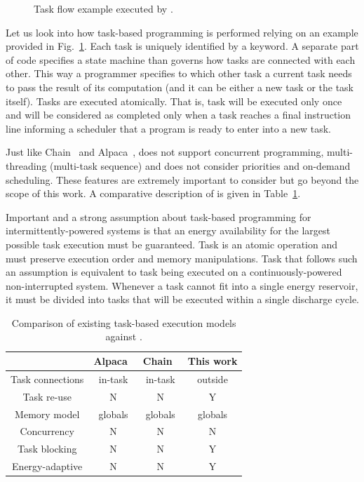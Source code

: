 \begin{figure}
	\centering
	\caption{Task flow example executed by \sys.}
	\label{fig:task_flow_example}
\end{figure}

Let us look into how task-based programming is performed relying on an example provided in Fig.~\ref{fig:task_flow_example}. Each task is uniquely identified by a keyword. A separate part of code specifies a state machine than governs how tasks are connected with each other. This way a programmer specifies to which other task a current task needs to pass the result of its computation (and it can be either a new task or the task itself). Tasks are executed atomically. That is, task will be executed only once and will be considered as completed only when a task reaches a final instruction line informing a scheduler that a program is ready to enter into a new task.

Just like Chain~\cite{chain} and Alpaca~\cite{alpaca}, \sys does not support concurrent programming, multi-threading (multi-task sequence) and does not consider priorities and on-demand scheduling. These features are extremely important to consider but go beyond the scope of this work. A comparative description of \sys is given in Table~\ref{table:feature_comparison}. 

Important and a strong assumption about task-based programming for intermittently-powered systems is that an energy availability for the largest possible task execution must be guaranteed. Task is an atomic operation and  must preserve execution order and memory manipulations. Task that follows such an assumption is equivalent to task being executed on a continuously-powered non-interrupted system. Whenever a task cannot fit into a single energy reservoir, it must be divided into tasks that will be executed within a single discharge cycle.

\begin{table}
	\begin{tabular}{|c|c|c|c|}
		\hline
		{~} & Alpaca~\cite{alpaca} & Chain~\cite{chain} & This work \\
		\hline\hline
		Task connections & in-task & in-task & outside \\
		Task re-use & N & N & Y\\
		Memory model & globals & globals & globals\\
		Concurrency & N & N & N \\
		Task blocking & N & N & Y \\
		Energy-adaptive & N & N & Y \\
		\hline
	\end{tabular}
	\caption{Comparison of existing task-based execution models against \sys.}
	\label{table:feature_comparison}
\end{table}

